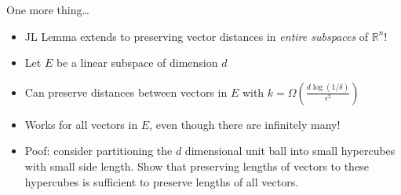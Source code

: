 \documentclass[aspectratio=169]{beamer}
\begin{document}
\begin{frame}{One more thing\ldots{}}
\protect\hypertarget{one-more-thing}{}
\begin{itemize}
\tightlist
\item
  JL Lemma extends to preserving vector distances in
  \textit{entire subspaces} of \(\mathbb{R}^n\)! \pause
\item
  Let \(E\) be a linear subspace of dimension \(d\) \pause
\item
  Can preserve distances between vectors in \(E\) with
  \(k = \Omega\left(\frac{d\log(1/\delta)}{\epsilon^2}\right)\) \pause
\item
  Works for all vectors in \(E\), even though there are infinitely many! \pause
\item
  Poof: consider partitioning the \(d\) dimensional unit ball into small
  hypercubes with small side length. Show that preserving lengths of
  vectors to these hypercubes is sufficient to preserve lengths of all
  vectors.
\end{itemize}
\end{frame}
\end{document}
